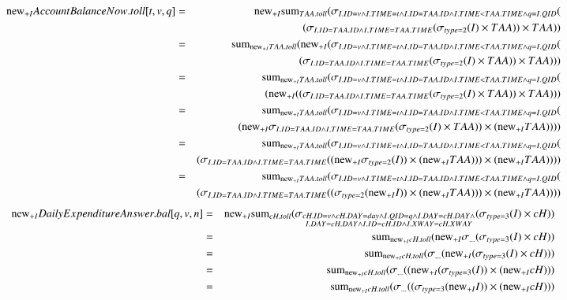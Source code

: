 \begin{eqnarray*}
\mathrm{new}_{+I} AccountBalanceNow.toll[t,v,q] &=&
\mathrm{new}_{+I} \mathrm{sum}_{TAA.toll} (\sigma_{I.ID = v \wedge I.	TIME = t \wedge I.ID = TAA.ID \wedge I.TIME < TAA.TIME \wedge q = I.QID} ( \\
&&(\sigma_{I.ID = TAA.ID \wedge I.TIME = TAA.TIME} 
(\sigma_{type = 2} (I) \times TAA))\times TAA))\\
&=& \mathrm{sum}_{\mathrm{new}_{+I} TAA.toll} (\mathrm{new}_{+I}(\sigma_{I.ID = v \wedge I.	TIME = t \wedge I.ID = TAA.ID \wedge I.TIME < TAA.TIME \wedge q = I.QID} ( \\
&&(\sigma_{I.ID = TAA.ID \wedge I.TIME = TAA.TIME} 
(\sigma_{type = 2} (I) \times TAA))\times TAA)))\\
&=& \mathrm{sum}_{\mathrm{new}_{+I} TAA.toll} (\sigma_{I.ID = v \wedge I.TIME = t \wedge I.ID = TAA.ID \wedge I.TIME < TAA.TIME \wedge q = I.QID} ( \\
&&(\mathrm{new}_{+I}((\sigma_{I.ID = TAA.ID \wedge I.TIME = TAA.TIME} (\sigma_{type = 2} (I) \times TAA))\times TAA)))\\
&=& \mathrm{sum}_{\mathrm{new}_{+I} TAA.toll} (\sigma_{I.ID = v \wedge I.TIME = t \wedge I.ID = TAA.ID \wedge I.TIME < TAA.TIME \wedge q = I.QID} ( \\
&&(\mathrm{new}_{+I} \sigma_{I.ID = TAA.ID \wedge I.TIME = TAA.TIME} (\sigma_{type = 2} (I) \times TAA))\times (\mathrm{new}_{+I}TAA))))\\
&=& \mathrm{sum}_{\mathrm{new}_{+I} TAA.toll} (\sigma_{I.ID = v \wedge I.TIME = t \wedge I.ID = TAA.ID \wedge I.TIME < TAA.TIME \wedge q = I.QID} ( \\
&&(\sigma_{I.ID = TAA.ID \wedge I.TIME = TAA.TIME} ((\mathrm{new}_{+I} \sigma_{type = 2} (I)) \times (\mathrm{new}_{+I} TAA)))\times (\mathrm{new}_{+I}TAA))))\\
&=& \mathrm{sum}_{\mathrm{new}_{+I} TAA.toll} (\sigma_{I.ID = v \wedge I.TIME = t \wedge I.ID = TAA.ID \wedge I.TIME < TAA.TIME \wedge q = I.QID} ( \\
&&(\sigma_{I.ID = TAA.ID \wedge I.TIME = TAA.TIME} (( \sigma_{type = 2} (\mathrm{new}_{+I}I)) \times (\mathrm{new}_{+I} TAA)))\times (\mathrm{new}_{+I}TAA))))\\\end{eqnarray*}
\begin{eqnarray*}
\mathrm{new}_{+I} DailyExpenditureAnswer.bal[q,v,n] &=& 
\mathrm{new}_{+I} \mathrm{sum}_{cH.toll} ( \sigma_{\substack{cH.ID = v \wedge cH.DAY = day \wedge I.QID = q \wedge I.DAY = cH.DAY \wedge\\ I.DAY = cH.DAY \wedge I.ID = cH.ID \wedge I.XWAY = cH.XWAY}} ( \sigma_{type = 3} (I) \times cH)) \\
&=& \mathrm{sum}_{\mathrm{new}_{+I} cH.toll} (\mathrm{new}_{+I} \sigma_{\dots} (\sigma_{type = 3} (I) \times cH))\\
&=& \mathrm{sum}_{\mathrm{new}_{+I} cH.toll} (\sigma_{\dots} (\mathrm{new}_{+I} (\sigma_{type = 3} (I) \times cH )))\\
&=& \mathrm{sum}_{\mathrm{new}_{+I} cH.toll} (\sigma_{\dots} ((\mathrm{new}_{+I} (\sigma_{type = 3} (I)) \times (\mathrm{new}_{+I} cH)))\\
&=& \mathrm{sum}_{\mathrm{new}_{+I} cH.toll} (\sigma_{\dots} ((\sigma_{type = 3} (\mathrm{new}_{+I} I)) \times (\mathrm{new}_{+I} cH)))
\end{eqnarray*}
